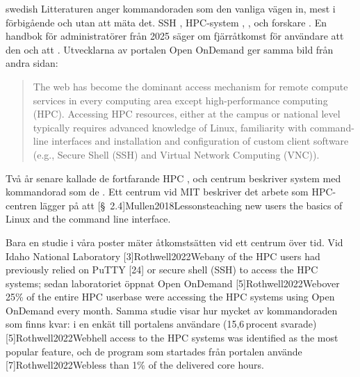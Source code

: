 \begin{onlyin}{swedish}
Litteraturen anger kommandoraden som den vanliga vägen in, mest i förbigående
och utan att mäta det.  SSH ,
HPC-system ,
, och forskare
.  En
handbok för administratörer från 2025 säger om fjärråtkomst för användare
att den  och att
.  Utvecklarna av portalen Open OnDemand ger samma bild från
andra sidan:
\foreignblockcquote{english}[1]{Hudak2018OnDemand}{The web has become
the dominant access mechanism for remote compute services in every
computing area except high-performance computing (HPC). Accessing HPC
resources, either at the campus or national level typically requires
advanced knowledge of Linux, familiarity with command-line interfaces and
installation and configuration of custom client software (e.g., Secure
Shell (SSH) and Virtual Network Computing (VNC)).}  Två år senare kallade
de fortfarande HPC
,
och centrum beskriver system med kommandorad som de
.  Ett
centrum vid MIT beskriver det arbete som HPC-centren lägger på att
[\S~2.4]{Mullen2018Lessons}{teaching new users
the basics of Linux and the command line interface}.

Bara en studie i våra poster mäter åtkomstsätten vid ett centrum över
tid.  Vid Idaho National Laboratory
[3]{Rothwell2022Web}{any of the
HPC users had previously relied on PuTTY [24] or secure shell (SSH) to
access the HPC systems}; sedan laboratoriet öppnat Open OnDemand
[5]{Rothwell2022Web}{over 25\% of the entire
HPC userbase were accessing the HPC systems using Open OnDemand every
month}.  Samma studie visar hur mycket av kommandoraden som finns kvar: i
en enkät till portalens användare (15,6\,procent svarade)
[5]{Rothwell2022Web}{hell access
to the HPC systems was identified as the most popular feature}, och de
program som startades från portalen använde
[7]{Rothwell2022Web}{less than 1\% of the
delivered core hours}.
\end{onlyin}

